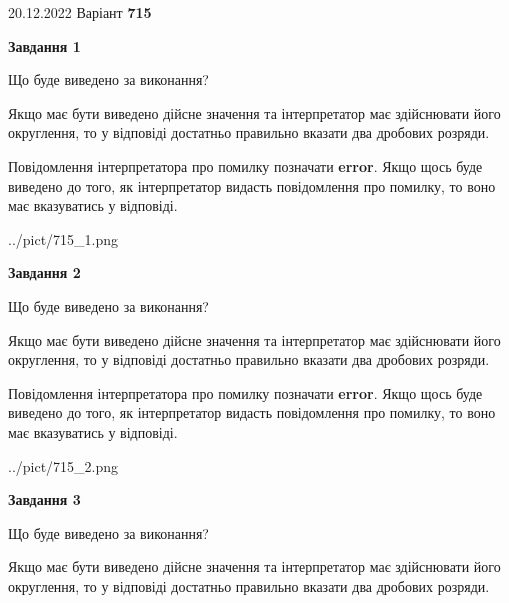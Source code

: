 \documentclass[12pt, ukrainian]{article}
\begin{document}
{20.12.2022 Варіант \No \textbf { 715 }\par}
{
\begin {Large}

{\begin {center}\textbf{Завдання 1}\end {center}}\par
Що буде виведено за виконання? \par

Якщо має бути виведено дійсне значення та інтерпретатор має здійснювати його округлення, 
то у відповіді достатньо правильно вказати два дробових розряди.

Повідомлення інтерпретатора про помилку позначати \textbf{error}.
Якщо щось буде виведено до того, як інтерпретатор видасть повідомлення про помилку, 
то воно має вказуватись у відповіді. \par

\begin{center}
	{../pict/715_1.png}
\end{center}
\newpage

{\begin {center}\textbf{Завдання 2}\end {center}}\par
Що буде виведено за виконання? \par

Якщо має бути виведено дійсне значення та інтерпретатор має здійснювати його округлення, 
то у відповіді достатньо правильно вказати два дробових розряди.

Повідомлення інтерпретатора про помилку позначати \textbf{error}.
Якщо щось буде виведено до того, як інтерпретатор видасть повідомлення про помилку, 
то воно має вказуватись у відповіді. \par

\begin{center}
	{../pict/715_2.png}
\end{center}
\newpage

{\begin {center}\textbf{Завдання 3}\end {center}}\par
Що буде виведено за виконання? \par

Якщо має бути виведено дійсне значення та інтерпретатор має здійснювати його округлення, 
то у відповіді достатньо правильно вказати два дробових розряди.


\end{Large}}
\end{document}
